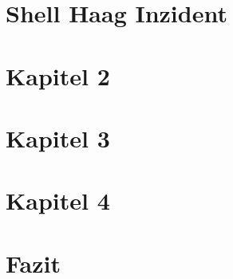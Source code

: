 \documentclass[a4paper, 12pt]{article} %
\begin{document}
\sloppy

\tableofcontents

\clearpage



\section{Shell Haag Inzident}
\section{Kapitel 2}
\section{Kapitel 3}
\section{Kapitel 4}
\section{Fazit}
\clearpage

\begingroup
\renewcommand{\bibfont}{\fontsize{13pt}{12pt}\selectfont}  
\sloppy
\nocite{*}
\printbibliography
\end{document}
